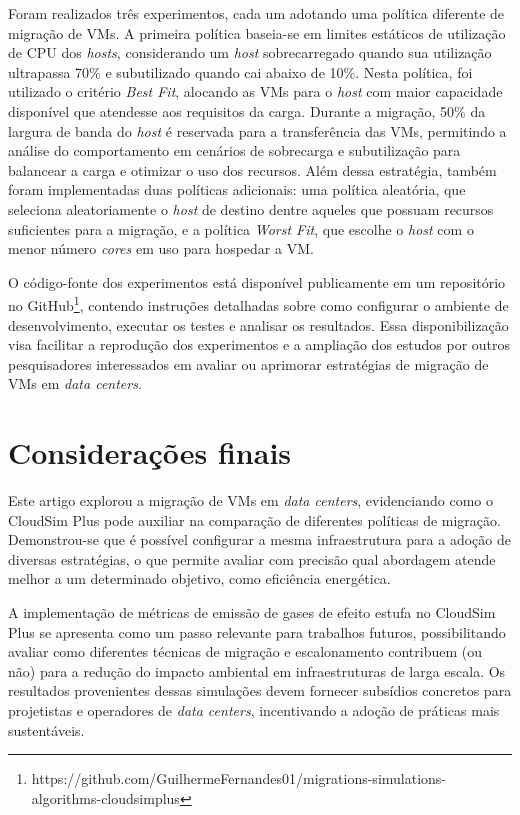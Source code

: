 \documentclass[12pt]{article}
\begin{document}
Foram realizados três experimentos, cada um adotando uma política diferente de migração de VMs. A primeira política baseia-se em limites estáticos de utilização de CPU dos \textit{hosts}, considerando um \textit{host} sobrecarregado quando sua utilização ultrapassa 70\% e subutilizado quando cai abaixo de 10\%. Nesta política, foi utilizado o critério \textit{Best Fit}, alocando as VMs para o \textit{host} com maior capacidade disponível que atendesse aos requisitos da carga. Durante a migração, 50\% da largura de banda do \textit{host} é reservada para a transferência das VMs, permitindo a análise do comportamento em cenários de sobrecarga e subutilização para balancear a carga e otimizar o uso dos recursos. Além dessa estratégia, também foram implementadas duas políticas adicionais: uma política aleatória, que seleciona aleatoriamente o \textit{host} de destino dentre aqueles que possuam recursos suficientes para a migração, e a política \textit{Worst Fit}, que escolhe o \textit{host} com o menor número \textit{cores} em uso para hospedar a VM.

O código-fonte dos experimentos está disponível publicamente em um repositório no GitHub\footnote{https://github.com/GuilhermeFernandes01/migrations-simulations-algorithms-cloudsimplus}, contendo instruções detalhadas sobre como configurar o ambiente de desenvolvimento, executar os testes e analisar os resultados. Essa disponibilização visa facilitar a reprodução dos experimentos e a ampliação dos estudos por outros pesquisadores interessados em avaliar ou aprimorar estratégias de migração de VMs em \textit{data centers}.

\section{Considerações finais}

Este artigo explorou a migração de VMs em \textit{data centers}, evidenciando como o CloudSim Plus pode auxiliar na comparação de diferentes políticas de migração. Demonstrou-se que é possível configurar a mesma infraestrutura para a adoção de diversas estratégias, o que permite avaliar com precisão qual abordagem atende melhor a um determinado objetivo, como eficiência energética.

A implementação de métricas de emissão de gases de efeito estufa no CloudSim Plus se apresenta como um passo relevante para trabalhos futuros, possibilitando avaliar como diferentes técnicas de migração e escalonamento contribuem (ou não) para a redução do impacto ambiental em infraestruturas de larga escala. Os resultados provenientes dessas simulações devem fornecer subsídios concretos para projetistas e operadores de \textit{data centers}, incentivando a adoção de práticas mais sustentáveis.
\end{document}
